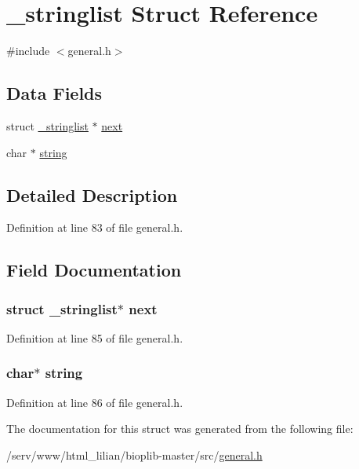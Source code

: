 \hypertarget{struct__stringlist}{\section{\-\_\-stringlist Struct Reference}
\label{struct__stringlist}
}


{\ttfamily \#include $<$general.\-h$>$}

\subsection*{Data Fields}
\begin{DoxyCompactItemize}
\item 
struct \hyperlink{struct__stringlist}{\-\_\-stringlist} $\ast$ \hyperlink{struct__stringlist_afb6bc89279bb76fa042e06df5a67ebe6}{next}
\item 
char $\ast$ \hyperlink{struct__stringlist_aed1cfb225a5fb77461e7972691e68a72}{string}
\end{DoxyCompactItemize}


\subsection{Detailed Description}


Definition at line 83 of file general.\-h.



\subsection{Field Documentation}
\hypertarget{struct__stringlist_afb6bc89279bb76fa042e06df5a67ebe6}{
\subsubsection[{next}]{\setlength{\rightskip}{0pt plus 5cm}struct {\bf \-\_\-stringlist}$\ast$ next}}\label{struct__stringlist_afb6bc89279bb76fa042e06df5a67ebe6}


Definition at line 85 of file general.\-h.

\hypertarget{struct__stringlist_aed1cfb225a5fb77461e7972691e68a72}{
\subsubsection[{string}]{\setlength{\rightskip}{0pt plus 5cm}char$\ast$ string}}\label{struct__stringlist_aed1cfb225a5fb77461e7972691e68a72}


Definition at line 86 of file general.\-h.



The documentation for this struct was generated from the following file\-:\begin{DoxyCompactItemize}
\item 
/serv/www/html\-\_\-lilian/bioplib-\/master/src/\hyperlink{general_8h}{general.\-h}\end{DoxyCompactItemize}
